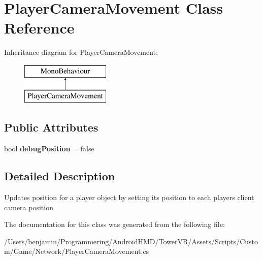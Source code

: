 \hypertarget{class_player_camera_movement}{}\section{Player\+Camera\+Movement Class Reference}
\label{class_player_camera_movement}
Inheritance diagram for Player\+Camera\+Movement\+:\begin{figure}[H]
\begin{center}
\leavevmode
\includegraphics[height=2.000000cm]{class_player_camera_movement}
\end{center}
\end{figure}
\subsection*{Public Attributes}
\begin{DoxyCompactItemize}
\item 
bool {\bfseries debug\+Position} = false\hypertarget{class_player_camera_movement_a617542dd9ab3ec53e2ea169e237e56e3}{}\label{class_player_camera_movement_a617542dd9ab3ec53e2ea169e237e56e3}

\end{DoxyCompactItemize}


\subsection{Detailed Description}
Updates position for a player object by setting its position to each player\textquotesingle{}s client camera position 

The documentation for this class was generated from the following file\+:\begin{DoxyCompactItemize}
\item 
/\+Users/benjamin/\+Programmering/\+Android\+H\+M\+D/\+Tower\+V\+R/\+Assets/\+Scripts/\+Custom/\+Game/\+Network/Player\+Camera\+Movement.\+cs\end{DoxyCompactItemize}
